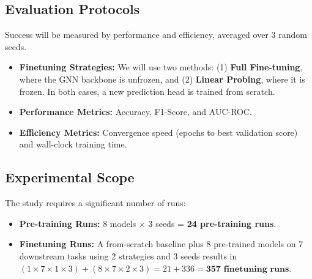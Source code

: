 \documentclass{acmart}
\begin{document}
\subsection{Evaluation Protocols}
Success will be measured by performance and efficiency, averaged over 3 random seeds.
\begin{itemize}
    \item \textbf{Finetuning Strategies:} We will use two methods: (1) \textbf{Full Fine-tuning}, where the GNN backbone is unfrozen, and (2) \textbf{Linear Probing}, where it is frozen. In both cases, a new prediction head is trained from scratch.
    \item \textbf{Performance Metrics:} Accuracy, F1-Score, and AUC-ROC.
    \item \textbf{Efficiency Metrics:} Convergence speed (epochs to best validation score) and wall-clock training time.
\end{itemize}

\subsection{Experimental Scope}
The study requires a significant number of runs:
\begin{itemize}
    \item \textbf{Pre-training Runs:} 8 models $\times$ 3 seeds = \textbf{24 pre-training runs}.
    \item \textbf{Finetuning Runs:} A from-scratch baseline plus 8 pre-trained models on 7 downstream tasks using 2 strategies and 3 seeds results in $(1 \times 7 \times 1 \times 3) + (8 \times 7 \times 2 \times 3) = 21 + 336 = \textbf{357 finetuning runs}$.
\end{itemize}



\end{document}
